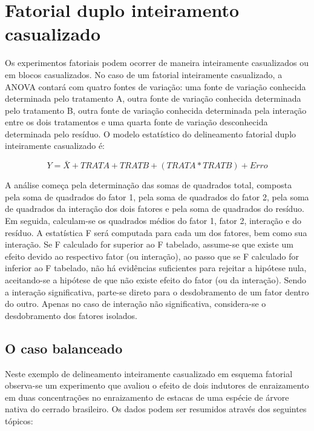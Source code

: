 \documentclass[
]{article}
\begin{document}
\hypertarget{fatorial-duplo-inteiramento-casualizado}{%
\section{Fatorial duplo inteiramento casualizado}\label{fatorial-duplo-inteiramento-casualizado}}

Os experimentos fatoriais podem ocorrer de maneira inteiramente casualizados ou em blocos casualizados. No caso de um fatorial inteiramente casualizado, a ANOVA contará com quatro fontes de variação: uma fonte de variação conhecida determinada pelo tratamento A, outra fonte de variação conhecida determinada pelo tratamento B, outra fonte de variação conhecida determinada pela interação entre os dois tratamentos e uma quarta fonte de variação desconhecida determinada pelo resíduo. O modelo estatístico do delineamento fatorial duplo inteiramente casualizado é:

\[Y = \bar{X} + TRAT A + TRAT B + (TRAT A * TRAT B) + Erro\]

A análise começa pela determinação das somas de quadrados total, composta pela soma de quadrados do fator 1, pela soma de quadrados do fator 2, pela soma de quadrados da interação dos dois fatores e pela soma de quadrados do resíduo. Em seguida, calculam-se os quadrados médios do fator 1, fator 2, interação e do resíduo. A estatística F será computada para cada um dos fatores, bem como sua interação. Se F calculado for superior ao F tabelado, assume-se que existe um efeito devido ao respectivo fator (ou interação), ao passo que se F calculado for inferior ao F tabelado, não há evidências suficientes para rejeitar a hipótese nula, aceitando-se a hipótese de que não existe efeito do fator (ou da interação). Sendo a interação significativa, parte-se direto para o desdobramento de um fator dentro do outro. Apenas no caso de interação não significativa, considera-se o desdobramento dos fatores isolados.

\hypertarget{o-caso-balanceado-2}{%
\subsection{O caso balanceado}\label{o-caso-balanceado-2}}

Neste exemplo de delineamento inteiramente casualizado em esquema fatorial observa-se um experimento que avaliou o efeito de dois indutores de enraizamento em duas concentrações no enraizamento de estacas de uma espécie de árvore nativa do cerrado brasileiro. Os dados podem ser resumidos através dos seguintes tópicos:
\end{document}

